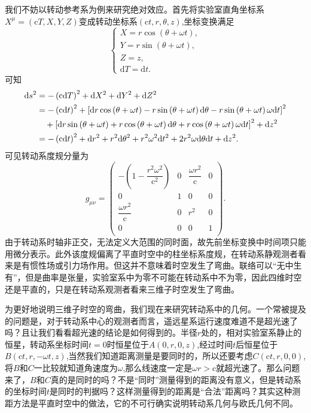 \documentclass[11pt, a4paper, oneside, onecolumn]{ctexart}
\numberwithin{equation}{subsection}
\begin{document}
我们不妨以转动参考系为例来研究绝对效应。首先将实验室直角坐标系$X^{\mu}=\left(\mathrm{c}T,X,Y,Z\right)$变成转动坐标系$\left(\mathrm{c}t,r,\theta,z\right)$,坐标变换满足
\begin{equation}
\begin{cases}
X=r\cos\left(\theta+\omega t\right),\\
Y=r\sin\left(\theta+\omega t\right),\\
Z=z,\\
\mathrm{d}T=\mathrm{d}t.
\end{cases}
\end{equation}
可知
\begin{align}
\mathrm{d}s^{2}&=-\left(\mathrm{c}\mathrm{d}T\right)^{2}+\mathrm{d}X^{2}+\mathrm{d}Y^{2}+\mathrm{d}Z^{2}\notag\\
&=-\left(\mathrm{c}\mathrm{d}t\right)^{2}+\left[\mathrm{d}r\cos\left(\theta+\omega t\right)-r\sin\left(\theta+\omega t\right)\mathrm{d}\theta-r\sin\left(\theta+\omega t\right)\omega\mathrm{d}t\right]^{2}\notag\\
&\quad+\left[\mathrm{d}r\sin\left(\theta+\omega t\right)+r\cos\left(\theta+\omega t\right)\mathrm{d}\theta+r\cos\left(\theta+\omega t\right)\omega\mathrm{d}t\right]^{2}+\mathrm{d}z^{2}\notag\\
&=-\left(\mathrm{c}\mathrm{d}t\right)^{2}+\mathrm{d}r^{2}+r^{2}\mathrm{d}\theta^{2}+r^{2}\omega^{2}\mathrm{d} t^{2}+2r^{2}\omega\mathrm{d}\theta\mathrm{d}t+\mathrm{d}z^{2}.
\end{align}
可见转动系度规分量为
\begin{equation}
g_{\mu\nu}=\begin{pmatrix}
-\left(1-\dfrac{r^{2}\omega^{2}}{\mathrm{c}^{2}}\right) & 0 & \dfrac{\omega r^{2}}{\mathrm{c}} & 0\\
0 & 1 & 0 & 0\\
\dfrac{\omega r^{2}}{\mathrm{c}} & 0 & r^{2} & 0\\
0 & 0 & 0 & 1\\
\end{pmatrix}.
\end{equation}
由于转动系时轴非正交，无法定义大范围的同时面，故先前坐标变换中时间项只能用微分表示。此外该度规偏离了平直时空中的柱坐标系度规，在转动系静观测者看来是有惯性场或引力场作用。但这并不意味着时空发生了弯曲。联络可以“无中生有”，但是曲率是张量，实验室系中为零不可能在转动系中不为零，因此四维时空还是平直的，只是在转动系观测者看来三维子时空发生了弯曲。

为更好地说明三维子时空的弯曲，我们现在来研究转动系中的几何。一个常被提及的问题是，对于转动系中心的观测者而言，遥远星系运行速度难道不是超光速了吗？且让我们看看超光速的结论是如何得到的。半径$r$处的，相对实验室系静止的恒星，转动系坐标时间$t=0$时恒星位于$A\left(0,r,0,z\right)$,经过时间$t$后恒星位于$B\left(\mathrm{c}t,r,-\omega t,z\right)$,当然我们知道距离测量是要同时的，所以还要考虑$C\left(\mathrm{c}t,r,0,0\right)$,将$B$和$C$一比较就知道角速度为$\omega$,那么线速度一定是$\omega r>\mathrm{c}$就超光速了。那么问题来了，$B$和$C$真的是同时的吗？不是“同时”测量得到的距离没有意义，但是转动系的坐标时间$t$是同时的判据吗？这样测量得到的距离是“合法”距离吗？其实这种测距方法是平直时空中的做法，它的不可行确实说明转动系几何与欧氏几何不同。
\end{document}

